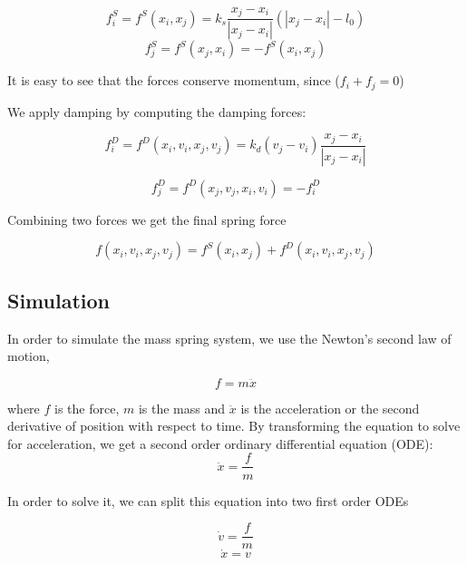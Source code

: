 \documentclass[en]{minipw} %
\begin{document}
\begin{equation}
f_{i}^{S} = f^{S}(x_i, x_j) = k_s \dfrac{x_j - x_i}{|x_j - x_i|}(|x_j - x_i| - l_0)
\end{equation}
\begin{equation}
f_{j}^{S} = f^{S}(x_j, x_i) = -f^{S}(x_i, x_j)
\end{equation}

It is easy to see that the forces conserve momentum, since ($f_i + f_j = 0$)

We apply damping by computing the damping forces:

\begin{equation}
f_{i}^{D} = f^{D}(x_i, v_i, x_j, v_j) = k_d (v_j - v_i) \dfrac{x_j - x_i}{|x_j - x_i|}
\end{equation}

\begin{equation}
f_{j}^{D} = f^{D}(x_j, v_j, x_i, v_i) = -f_{i}^{D}
\end{equation}

Combining two forces we get the final spring force

\begin{equation}
f(x_i, v_i, x_j, v_j) = f^{S}(x_i, x_j) + f^{D}(x_i, v_i, x_j, v_j)
\end{equation}

\subsection{Simulation}
In order to simulate the mass spring system, we use the Newton's second law of motion,

\begin{equation}
f = m \ddot{x}
\end{equation}

where $f$ is the force, $m$ is the mass and $\ddot{x}$ is the acceleration or the second derivative of position with respect to time. By transforming the equation to solve for acceleration, we get a second order ordinary differential equation (ODE):
\begin{equation}
\ddot{x} = \dfrac{f}{m}
\end{equation}

In order to solve it, we can split this equation into two first order ODEs

\begin{equation}
\label{eq:ode_v} 
\dot{v} = \dfrac{f}{m}
\end{equation}
\begin{equation}
\label{eq:ode_x} 
\dot{x} = v
\end{equation}
\end{document}
